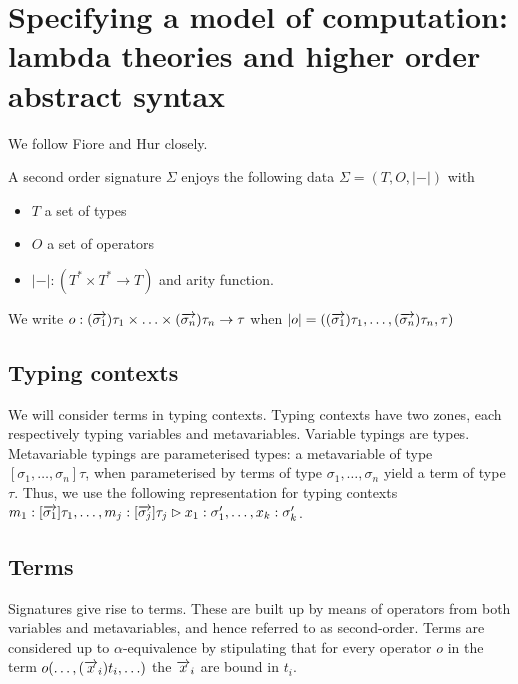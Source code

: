 \section{Specifying a model of computation: lambda theories and higher order abstract syntax}

We follow Fiore and Hur \cite{DBLP:conf/csl/FioreH10} closely.

\begin{definition}
  A second order signature $\Sigma$ enjoys the following data $\Sigma = (T,O,|-|)$ with
  \begin{itemize}
    \item $T$ a set of types
    \item $O$ a set of operators
      \item $|-| : (T^{*} \times T^{*} \to T)$ and arity function.
  \end{itemize}  
\end{definition}

We write $o : (\overrightarrow{\sigma_{1}})\tau_{1} \times \ldots \times (\overrightarrow{\sigma_{n}})\tau_{n} \to \tau$ when $|o| = ((\overrightarrow{\sigma_{1}})\tau_{1}, \ldots, (\overrightarrow{\sigma_{n}})\tau_{n}, \tau)$

\subsection{Typing contexts}
We will consider terms in typing contexts. Typing contexts have two
zones, each respectively typing variables and metavariables. Variable
typings are types. Metavariable typings are parameterised types: a
metavariable of type $[\sigma_{1},\ldots,\sigma_{n}]\tau$, when
parameterised by terms of type $\sigma_{1},\ldots,\sigma_{n}$ yield a
term of type $\tau$. Thus, we use the following representation for
typing contexts $m_{1} : [\overrightarrow{\sigma_{1}}]\tau_{1}, \ldots, m_{j}: [\overrightarrow{\sigma_{j}}]\tau_{j} \rhd x_{1} : \sigma'_{1}, \ldots, x_{k}: \sigma'_{k}$.

\subsection{Terms}
 Signatures give rise to terms. These are built up by means of operators
from both variables and metavariables, and hence referred to as second-order.
Terms are considered up to $\alpha$-equivalence by stipulating that for every operator $o$ in the term $o(\ldots,(\overrightarrow{x}_{i})t_{i},\ldots)$ the $\overrightarrow{x}_{i}$ are bound in $t_{i}$.

